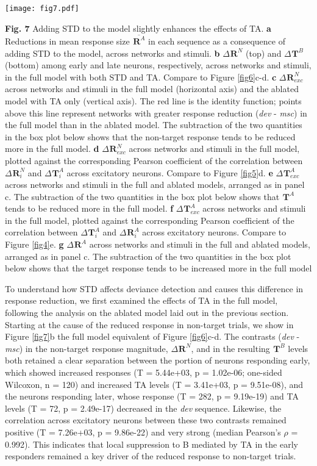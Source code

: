 \documentclass[pdflatex,referee,iicol,sn-basic]{sn-jnl}
\newcommand{\dev}{\textit{dev}}
\newcommand{\msc}{\textit{msc}}
\renewcommand{\R}[3][]{{}^{#1}_{}\mathbf{R}^{#2}_{#3}}
\renewcommand{\T}[3][]{{}^{#1}_{}\mathbf{T}^{#2}_{#3}}
\newcommand{\mean}[1]{\overline{#1}}
\newcommand{\refpanel}[2]{Figure \ref{fig#1}\lowercase{#2}}
\begin{document}
\begin{figure*}%
    \centering
    \texttt{[image: fig7.pdf]}
    \caption{}
    \label{fig7}
\end{figure*}
\textbf{Fig. 7} Adding STD to the model slightly enhances the effects of TA.
\textbf{a} Reductions in mean response size $\mean{\R{A}{}}$ in each sequence as a consequence of adding STD to the model, across networks and stimuli.
\textbf{b} $\Delta \R{N}{}$ (top) and $\Delta \T{B}{}$ (bottom) among early and late neurons, respectively, across networks and stimuli, in the full model with both STD and TA. Compare to \refpanel{6}{c-d}.
\textbf{c} $\Delta \R{N}{exc}$ across networks and stimuli in the full model (horizontal axis) and the ablated model with TA only (vertical axis). The red line is the identity function; points above this line represent networks with greater response reduction (\dev{} - \msc{}) in the full model than in the ablated model. The subtraction of the two quantities in the box plot below shows that the non-target response tends to be reduced more in the full model.
\textbf{d} $\Delta \R{N}{exc}$ across networks and stimuli in the full model, plotted against the corresponding Pearson coefficient of the correlation between $\Delta \R{N}{i}$ and $\Delta \T{A}{i}$ across excitatory neurons. Compare to \refpanel{5}{d}.
\textbf{e} $\Delta \T{A}{exc}$ across networks and stimuli in the full and ablated models, arranged as in panel c. The subtraction of the two quantities in the box plot below shows that $\T{A}{}$ tends to be reduced more in the full model.
\textbf{f} $\Delta \T{A}{exc}$ across networks and stimuli in the full model, plotted against the corresponding Pearson coefficient of the correlation between $\Delta \T{A}{i}$ and $\Delta \R{A}{i}$ across excitatory neurons. Compare to \refpanel{4}{e}.
\textbf{g} $\Delta \R{A}{}$ across networks and stimuli in the full and ablated models, arranged as in panel c. The subtraction of the two quantities in the box plot below shows that the target response tends to be increased more in the full model

To understand how STD affects deviance detection and causes this difference in response reduction, we first examined the effects of TA in the full model, following the analysis on the ablated model laid out in the previous section. Starting at the cause of the reduced response in non-target trials, we show in \refpanel{7}{b} the full model equivalent of \refpanel{6}{c-d}. The contrasts (\dev{} - \msc{}) in the non-target response magnitude, $\Delta \R{N}{}$, and in the resulting $\T{B}{}$ levels both retained a clear separation between the portion of neurons responding early, which showed increased responses (T = 5.44e+03, p = 1.02e-06; one-sided Wilcoxon, n = 120) and increased TA levels (T = 3.41e+03, p = 9.51e-08), and the neurons responding later, whose response (T = 282, p = 9.19e-19) and TA levels (T = 72, p = 2.49e-17) decreased in the \dev{} sequence. Likewise, the correlation across excitatory neurons between these two contrasts remained positive (T = 7.26e+03, p = 9.86e-22) and very strong (median Pearson's $\rho$ = 0.992). This indicates that local suppression to B mediated by TA in the early responders remained a key driver of the reduced response to non-target trials.
\end{document}
